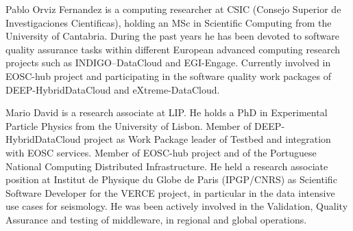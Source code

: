 \documentclass[journal]{IEEEtran}
\begin{document}
\begin{IEEEbiography}{Pablo Orviz Fernandez}
is a computing researcher at CSIC (Consejo Superior de Investigaciones
Cientificas), holding an MSc in Scientific Computing from the University of
Cantabria. During the past years he has been devoted to software quality
assurance tasks within different European advanced computing research projects
such as INDIGO--DataCloud and EGI-Engage. Currently involved in EOSC-hub project
and participating in the software quality work packages of DEEP-HybridDataCloud
and eXtreme-DataCloud.
\end{IEEEbiography}

\begin{IEEEbiography}{Mario David}
is a research associate at LIP. He holds a PhD in Experimental Particle Physics from the University of Lisbon.
Member of DEEP-HybridDataCloud project as Work Package leader of Testbed and integration with EOSC services. Member of EOSC-hub project and
of the Portuguese National Computing Distributed Infrastructure.
He held a research associate position at Institut de Physique du Globe de Paris (IPGP/CNRS) as Scientific Software Developer for the VERCE project, in particular in the data intensive use cases for seismology.
He was been actively involved in the Validation, Quality Assurance and testing of middleware, in regional and global operations.
\end{IEEEbiography}
\end{document}
